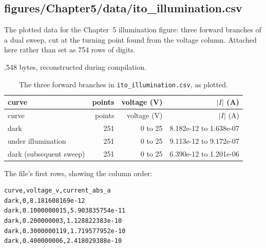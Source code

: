 \documentclass[a4paper,10pt]{article}
\begin{document}
\subsection{figures/Chapter5/data/ito\_illumination.csv}
The plotted data for the Chapter~5 illumination figure: three forward branches of a dual sweep, cut at the turning point found from the voltage column. Attached here rather than set as 754 rows of digits.

 ,548 bytes, reconstructed during compilation.

\begin{longtable}{@{}l r r r@{}}
\caption{The three forward branches in \texttt{ito\_illumination.csv}, as plotted.}\\
\toprule curve & points & voltage (V) & $|I|$ (A) \\ \midrule
\endfirsthead
\toprule curve & points & voltage (V) & $|I|$ (A) \\ \midrule
\endhead
\bottomrule
\endlastfoot
dark & 251 & 0 to 25 & 8.182e-12 to 1.638e-07 \\
under illumination & 251 & 0 to 25 & 9.113e-12 to 9.172e-07 \\
dark (subsequent sweep) & 251 & 0 to 25 & 6.390e-12 to 1.201e-06 \\
\end{longtable}
The file's first rows, showing the column order:
\begin{Verbatim}
curve,voltage_v,current_abs_a
dark,0,8.181608169e-12
dark,0.1000000015,5.903835754e-11
dark,0.200000003,1.128822383e-10
dark,0.3000000119,1.719577952e-10
dark,0.400000006,2.418029388e-10
\end{Verbatim}
\end{document}

